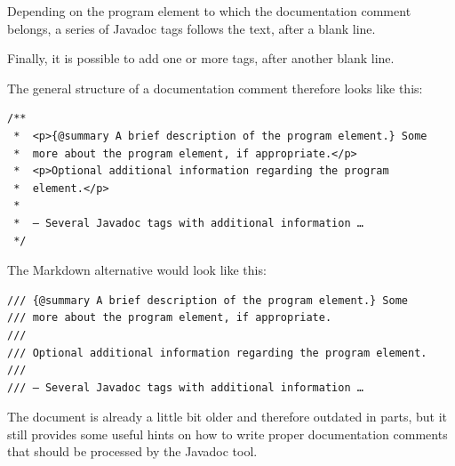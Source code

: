 Depending on the program element to which the documentation comment belongs, a series of Javadoc tags follows the text, after a blank line.

Finally, it is possible to add one or more  tags, after another blank line.

The general structure of a documentation comment therefore looks like this:
\begin{lstlisting}
/**
 *  <p>{@summary A brief description of the program element.} Some
 *  more about the program element, if appropriate.</p>
 *  <p>Optional additional information regarding the program 
 *  element.</p>
 *
 *  – Several Javadoc tags with additional information …
 */
\end{lstlisting}

The Markdown alternative would look like this:
\begin{lstlisting}
/// {@summary A brief description of the program element.} Some
/// more about the program element, if appropriate.
///
/// Optional additional information regarding the program element.
///
/// – Several Javadoc tags with additional information …
\end{lstlisting}

The document  \autocite{ORACLE_DOC_JAVADOC_HOWTO} is already a little bit older and therefore outdated in parts, but it still provides some useful hints on how to write proper documentation comments that should be processed by the Javadoc tool.


